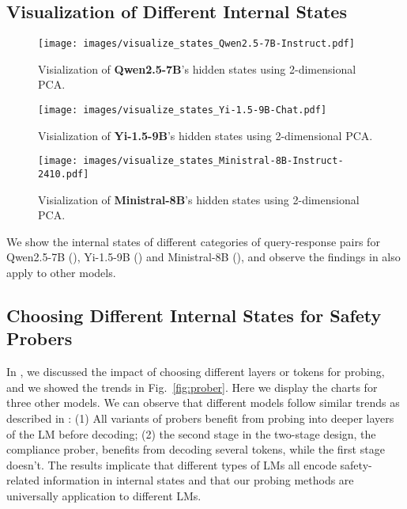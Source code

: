 \subsection{Visualization of Different Internal States}

\begin{figure*}[htbp]
    \centering
    \texttt{[image: images/visualize\_states\_Qwen2.5-7B-Instruct.pdf]}
    \caption{Visialization of \textbf{Qwen2.5-7B}'s hidden states using 2-dimensional PCA.}
    \label{fig:visual_states_q}
\end{figure*}

\begin{figure*}[htbp]
    \centering
    \texttt{[image: images/visualize\_states\_Yi-1.5-9B-Chat.pdf]}
    \caption{Visialization of \textbf{Yi-1.5-9B}'s hidden states using 2-dimensional PCA.}
    \label{fig:visual_states_yi}
\end{figure*}


\begin{figure*}[htbp]
    \centering
    \texttt{[image: images/visualize\_states\_Ministral-8B-Instruct-2410.pdf]}
    \caption{Visialization of \textbf{Ministral-8B}'s hidden states using 2-dimensional PCA.}
    \label{fig:visual_states_mi}
\end{figure*}


We show the internal states of different categories of query-response pairs for Qwen2.5-7B (), Yi-1.5-9B () and Ministral-8B (), and observe the findings in  also apply to other models.



\subsection{Choosing Different Internal States for Safety Probers}
In , we discussed the impact of choosing different layers or tokens for probing, and we showed the trends in Fig.~\ref{fig:prober}. Here we display the charts for three other models. We can observe that different models follow similar trends as described in : (1) All variants of probers benefit from probing into deeper layers of the LM before decoding; (2) the second stage in the two-stage design, the compliance prober, benefits from decoding several tokens, while the first stage doesn't. The results implicate that different types of LMs all encode safety-related information in internal states and that our probing methods are universally application to different LMs.


